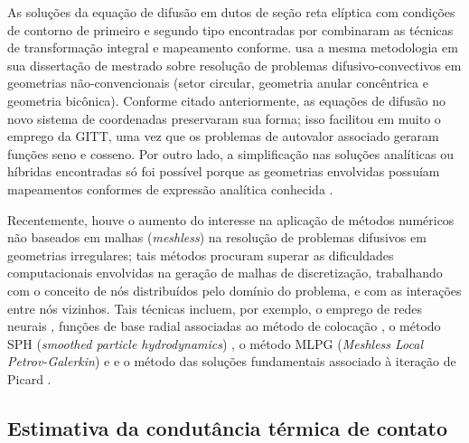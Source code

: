 As soluções da equação de difusão em dutos de seção reta elíptica com condições de contorno de primeiro e segundo tipo encontradas por
 \citet{trabalho_maia_1, trabalho_maia_2} combinaram as técnicas de transformação integral e mapeamento conforme. 
\cite{tese_antonini} usa a mesma metodologia em sua dissertação de mestrado sobre resolução de problemas difusivo-convectivos em geometrias não-convencionais (setor circular, geometria anular
concêntrica e geometria bicônica). Conforme citado anteriormente, as equações de difusão no novo sistema de coordenadas preservaram sua forma; isso facilitou em
muito o emprego da GITT, uma vez que os problemas de autovalor associado geraram funções seno e cosseno. Por outro lado, a
simplificação nas soluções analíticas ou híbridas encontradas só foi possível porque as geometrias envolvidas possuíam mapeamentos conformes de expressão analítica
conhecida \citep{livro_brown}.

Recentemente, houve o aumento do interesse na aplicação de métodos numéricos não baseados em malhas (\textit{meshless}) na resolução
de problemas difusivos em geometrias irregulares; tais métodos procuram superar as dificuldades computacionais envolvidas na geração
de malhas de discretização, trabalhando com o conceito de nós distribuídos pelo domínio do problema, e com as interações entre nós
vizinhos. Tais técnicas incluem, por exemplo, o emprego de redes neurais \citep{artigo_deng, artigo_heidari}, funções de base
radial associadas ao método de colocação \citep{artigo_chen, artigo_dai}, o método SPH (\textit{smoothed particle hydrodynamics}) \citep{artigo_vishwakarma}, o método MLPG (\textit{Meshless Local Petrov-Galerkin})
\citep{artigo_li} e e o método das soluções fundamentais associado à iteração de Picard \citep{artigo_alves_2}.

\subsection{Estimativa da condutância térmica de contato}

